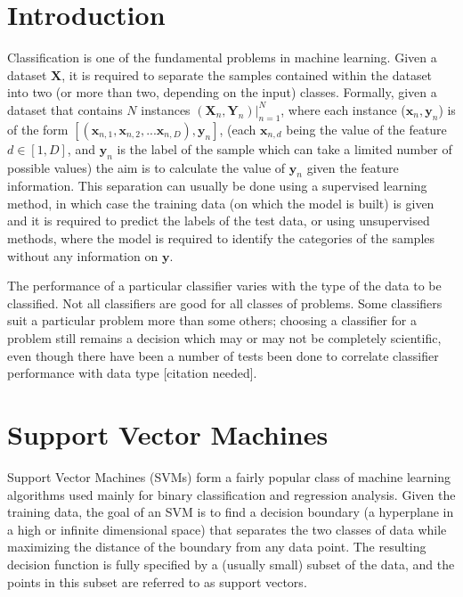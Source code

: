 \section{Introduction}
Classification is one of the fundamental problems in machine learning. Given a dataset $\mathbf{X}$, it is required to separate the samples contained within the dataset into two (or more than two, depending on the input) classes. Formally, given a dataset that contains $N$ instances $(\mathbf{X}_{n}, \mathbf{Y}_n) |_{n = 1}^{N}$, where each instance ($\mathbf{x}_{n}, \mathbf{y}_{n}$) is of the form $[(\mathbf{x}_{n, 1}, \mathbf{x}_{n, 2}, ... \mathbf{x}_{n, D}), \mathbf{y}_{n}]$, (each $\mathbf{x}_{n, d}$ being the value of the feature $d \in [1, D]$, and $\mathbf{y}_{n}$ is the label of the sample which can take a limited number of possible values) the aim is to calculate the value of $\mathbf{y}_{n}$ given the feature information. This separation can usually be done using a supervised learning method, in which case the training data (on which the model is built) is given and it is required to predict the labels of the test data, or using unsupervised methods, where the model is required to identify the categories of the samples without any information on $\mathbf{y}$.

The performance of a particular classifier varies with the type of the data to be classified. Not all classifiers are good for all classes of problems. Some classifiers suit a particular problem more than some others; choosing a classifier for a problem still remains a decision which may or may not be completely scientific, even though there have been a number of tests been done to correlate classifier performance with data type [citation needed].

\section{Support Vector Machines}
Support Vector Machines (SVMs) form a fairly popular class of machine learning algorithms used mainly for binary classification and regression analysis. Given the training data, the goal of an SVM is to find a decision boundary (a hyperplane in a high or infinite dimensional space) that separates the two classes of data while maximizing the distance of the boundary from any data point. The resulting decision function is fully specified by a (usually small) subset of the data, and the points in this subset are referred to as support vectors.

